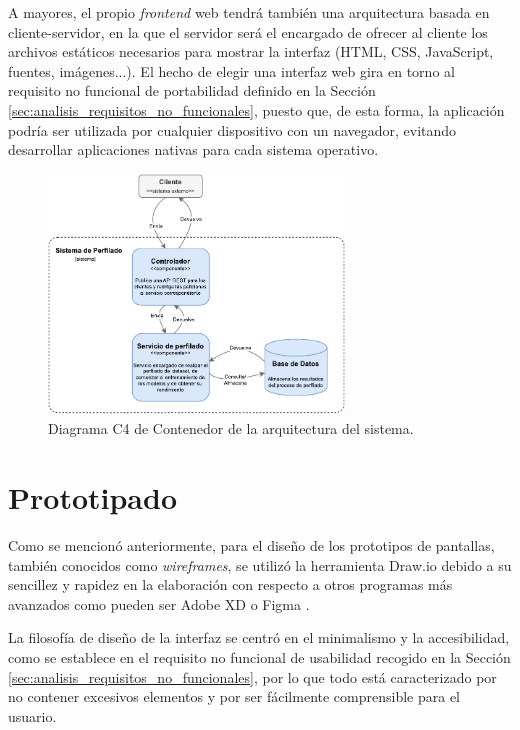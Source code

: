 \bigskip
A mayores, el propio \textit{frontend} web tendrá también una arquitectura basada en cliente-servidor, en la que el servidor será el encargado
de ofrecer al cliente los archivos estáticos necesarios para mostrar la interfaz (HTML, CSS, JavaScript, fuentes, imágenes...). El hecho
de elegir una interfaz web gira en torno al requisito no funcional de portabilidad definido en la Sección \ref{sec:analisis_requisitos_no_funcionales},
puesto que, de esta forma, la aplicación podría ser utilizada por cualquier dispositivo con un navegador, evitando
desarrollar aplicaciones nativas para cada sistema operativo.

\bigskip
\begin{figure}[H]
	\centering
	\includegraphics[width=0.7\textwidth]{diagramas/arquitectura_contenedor.pdf}
	\caption{Diagrama C4 de Contenedor de la arquitectura del sistema.}
	\label{fig:arquitectura_contenedor}
\end{figure}

\section{Prototipado}
\label{sec:diseño_prototipado}

Como se mencionó anteriormente, para el diseño de los prototipos de pantallas, también conocidos como \textit{wireframes}, se utilizó
la herramienta Draw.io \cite{drawio} debido a su sencillez y rapidez en la elaboración con respecto a otros programas más avanzados
como pueden ser Adobe XD \cite{adobexd} o Figma \cite{figma}.

\bigskip
La filosofía de diseño de la interfaz se centró en el minimalismo y la accesibilidad, como se establece en el requisito no funcional de usabilidad
recogido en la Sección \ref{sec:analisis_requisitos_no_funcionales}, por lo que todo está caracterizado por no contener excesivos elementos y por ser fácilmente comprensible para el usuario. 

